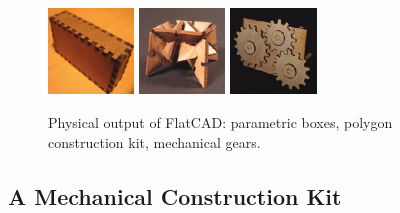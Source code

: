 \documentclass[times, 10pt,twocolumn]{article}
\begin{document}
\begin{figure}[h]
   \centering
     \includegraphics[width=0.9in]{physical-output-boxcad-correct.pdf}
   \hspace{2mm}
     \includegraphics[width=0.9in]{physical-output-jessica-correct.pdf}
   \hspace{2mm}
     \includegraphics[width=0.9in]{physical-output-gears-correct.pdf}
   \caption{Physical output of \nohyphens{FlatCAD}: parametric boxes, polygon construction kit, mechanical gears.}
   \label{fig:physical-output}
\end{figure}

\subsection{A Mechanical Construction Kit}
\end{document}
